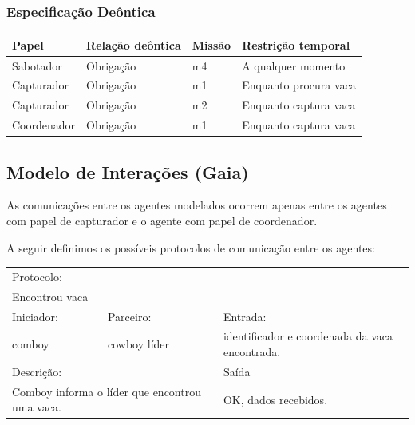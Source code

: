 \documentclass{llncs}
\begin{document}
\subsubsection{Especificação Deôntica}

\begin{center}
\begin{tabular}{|l|l|l|l|}
\hline
\rowcolor[gray]{0.8} \textbf{Papel}		&\textbf{Relação deôntica} 	&\textbf{Missão}	&\textbf{Restrição temporal}\\
\hline
Sabotador	&Obrigação	&m4	&A qualquer momento \\
\hline
Capturador	&Obrigação	&m1	&Enquanto procura vaca \\
\hline
Capturador	&Obrigação	&m2	&Enquanto captura vaca \\
\hline
Coordenador	&Obrigação	&m1	&Enquanto captura vaca \\
\hline
\end{tabular}
\end{center}

\newpage

\subsection{Modelo de Interações (Gaia)}

As comunicações entre os agentes modelados ocorrem apenas entre os agentes com papel de capturador e o agente com papel de coordenador.

A seguir definimos os possíveis protocolos de comunicação entre os agentes:


\begin{center}
\begin{tabular}{|p{2.5cm}|p{2.5cm}|p{5cm}}
\cline{1-2}
\multicolumn{2}{|l|}{Protocolo:} \\
\multicolumn{2}{|l|}{Encontrou vaca}  \\
\hline
Iniciador: 			&Parceiro:		&Entrada: \\
comboy 			&cowboy líder		&identificador e coordenada da vaca encontrada. \\
\hline
\multicolumn{2}{|p{5cm}|}{Descrição:}  &Saída \\
\multicolumn{2}{|p{5cm}|}{Comboy informa o líder que encontrou uma vaca.}  &OK, dados recebidos. \\
\hline
\end{tabular}
\end{center}
\end{document}
